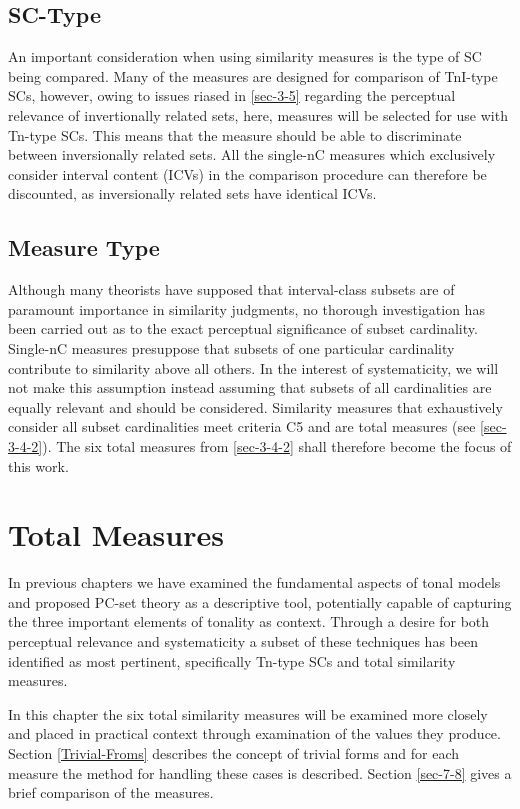 \documentclass{article}
\begin{document}
\subsection{SC-Type}
\label{sec-6-3}

An important consideration when using similarity measures is the type
of SC being compared. Many of the measures are designed for comparison
of TnI-type SCs, however, owing to issues riased in \ref{sec-3-5} regarding the perceptual relevance of invertionally related
sets, here, measures will be selected for use with Tn-type SCs. This
means that the measure should be able to discriminate between
inversionally related sets. All the single-nC measures which
exclusively consider interval content (ICVs) in the comparison
procedure can therefore be discounted, as inversionally related sets
have identical ICVs.
\subsection{Measure Type}
\label{sec-6-4}

Although many theorists have supposed that interval-class subsets are
of paramount importance in similarity judgments, no thorough
investigation has been carried out as to the exact perceptual
significance of subset cardinality. Single-nC measures presuppose that
subsets of one particular cardinality contribute to similarity above
all others. In the interest of systematicity, we will not make this
assumption instead assuming that subsets of all cardinalities are
equally relevant and should be considered. Similarity measures that
exhaustively consider all subset cardinalities meet criteria C5 and
are total measures (see \ref{sec-3-4-2}). The six total measures
from \ref{sec-3-4-2} shall therefore become the focus of this
work.
\section{Total Measures}
\label{sec-7}

In previous chapters we have examined the fundamental aspects of tonal
models and proposed PC-set theory as a descriptive tool, potentially
capable of capturing the three important elements of tonality as
context. Through a desire for both perceptual relevance and
systematicity a subset of these techniques has been identified as most
pertinent, specifically Tn-type SCs and total similarity measures.

In this chapter the six total similarity measures will be examined
more closely and placed in practical context through examination of
the values they produce. Section \ref{Trivial-Froms} describes the concept
of trivial forms and for each measure the method for handling these
cases is described. Section \ref{sec-7-8} gives a brief
comparison of the measures.
\end{document}
